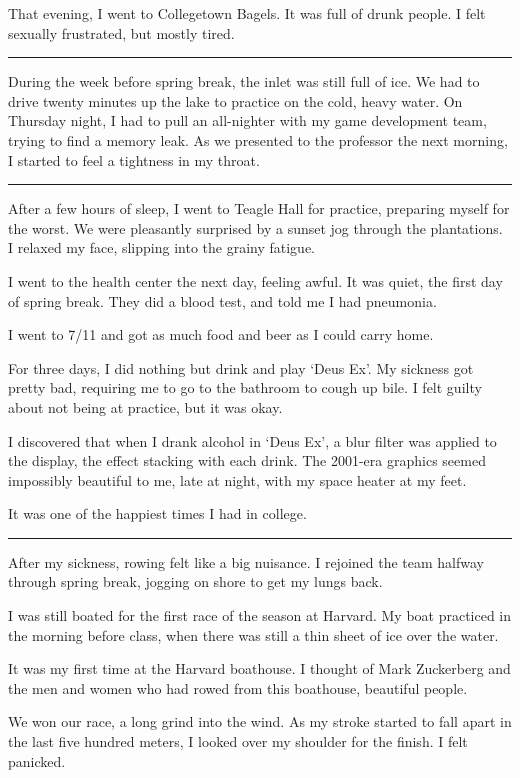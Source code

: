 That evening, I went to Collegetown Bagels.  It was full of drunk people.  I
felt sexually frustrated, but mostly tired.

\plainfancybreak{12pt}{2}{}

During the week before spring break, the inlet was still full of ice.  We had to
drive twenty minutes up the lake to practice on the cold, heavy water. On
Thursday night, I had to pull an all-nighter with my game development team,
trying to find a memory leak. As we presented to the professor the next morning,
I started to feel a tightness in my throat.

\plainfancybreak{12pt}{2}{}

After a few hours of sleep, I went to Teagle Hall for practice, preparing myself
for the worst.  We were pleasantly surprised by a sunset jog through the
plantations.  I relaxed my face, slipping into the grainy fatigue.

I went to the health center the next day, feeling awful.  It was quiet, the
first day of spring break.  They did a blood test, and told me I had pneumonia.

I went to 7/11 and got as much food and beer as I could carry home.

For three days, I did nothing but drink and play `Deus Ex'.  My sickness got
pretty bad, requiring me to go to the bathroom to cough up bile.  I felt guilty
about not being at practice, but it was okay.

I discovered that when I drank alcohol in `Deus Ex', a blur filter was applied
to the display, the effect stacking with each drink.  The 2001-era graphics
seemed impossibly beautiful to me, late at night, with my space heater at my
feet.

It was one of the happiest times I had in college.

\plainfancybreak{12pt}{2}{}

After my sickness, rowing felt like a big nuisance.  I rejoined the team halfway
through spring break, jogging on shore to get my lungs back.

I was still boated for the first race of the season at Harvard.  My boat
practiced in the morning before class, when there was still a thin sheet of ice
over the water.

It was my first time at the Harvard boathouse.  I thought of Mark Zuckerberg and
the men and women who had rowed from this boathouse, beautiful people.

We won our race, a long grind into the wind.  As my stroke started to fall apart
in the last five hundred meters, I looked over my shoulder for the finish.  I felt
panicked.

